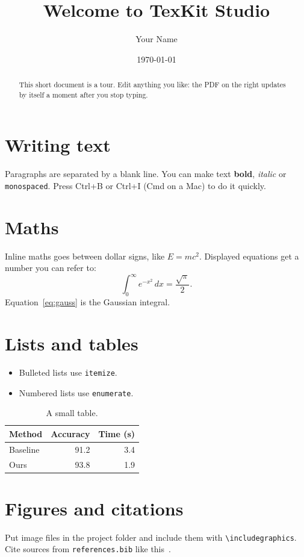 \documentclass[11pt]{article}
\title{Welcome to TexKit Studio}
\author{Your Name}
\date{\today}
\begin{document}
\maketitle

\begin{abstract}
This short document is a tour. Edit anything you like: the PDF on the right
updates by itself a moment after you stop typing.
\end{abstract}

\section{Writing text}
Paragraphs are separated by a blank line. You can make text \textbf{bold},
\textit{italic} or \texttt{monospaced}. Press Ctrl+B or Ctrl+I (Cmd on a Mac)
to do it quickly.

\section{Maths}
Inline maths goes between dollar signs, like $E = mc^2$. Displayed equations
get a number you can refer to:
\begin{equation}
  \int_0^\infty e^{-x^2}\,dx = \frac{\sqrt{\pi}}{2}.
  \label{eq:gauss}
\end{equation}
Equation~\eqref{eq:gauss} is the Gaussian integral.

\section{Lists and tables}
\begin{itemize}
  \item Bulleted lists use \texttt{itemize}.
  \item Numbered lists use \texttt{enumerate}.
\end{itemize}

\begin{table}[ht]
  \centering
  \caption{A small table.}
  \label{tab:example}
  \begin{tabular}{lrr}
    \toprule
    Method & Accuracy & Time (s) \\
    \midrule
    Baseline & 91.2 & 3.4 \\
    Ours     & 93.8 & 1.9 \\
    \bottomrule
  \end{tabular}
\end{table}

\section{Figures and citations}
Put image files in the project folder and include them with
\verb|\includegraphics|. Cite sources from \texttt{references.bib}
like this~\cite{knuth1984}.
\end{document}
